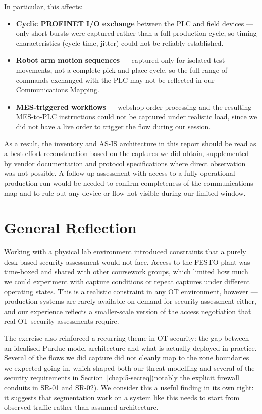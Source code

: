 \documentclass{report}
\begin{document}
In particular, this affects:
\begin{itemize}
    \item \textbf{Cyclic PROFINET I/O exchange} between the PLC and field devices — only short bursts were captured rather than a full production cycle, so timing characteristics (cycle time, jitter) could not be reliably established.
    \item \textbf{Robot arm motion sequences} — captured only for isolated test movements, not a complete pick-and-place cycle, so the full range of commands exchanged with the PLC may not be reflected in our Communications Mapping.
    \item \textbf{MES-triggered workflows} — webshop order processing and the resulting MES-to-PLC instructions could not be captured under realistic load, since we did not have a live order to trigger the flow during our session.
\end{itemize}

As a result, the inventory and AS-IS architecture in this report should be read as a best-effort reconstruction based on the captures we did obtain, supplemented by vendor documentation and protocol specifications where direct observation was not possible. A follow-up assessment with access to a fully operational production run would be needed to confirm completeness of the communications map and to rule out any device or flow not visible during our limited window.


\section{General Reflection}

Working with a physical lab environment introduced constraints that a purely desk-based security assessment would not face. Access to the FESTO plant was time-boxed and shared with other coursework groups, which limited how much we could experiment with capture conditions or repeat captures under different operating states. This is a realistic constraint in any OT environment, however — production systems are rarely available on demand for security assessment either, and our experience reflects a smaller-scale version of the access negotiation that real OT security assessments require.

The exercise also reinforced a recurring theme in OT security: the gap between an idealised Purdue-model architecture and what is actually deployed in practice. Several of the flows we did capture did not cleanly map to the zone boundaries we expected going in, which shaped both our threat modelling and several of the security requirements in Section~\ref{chap:5-secreq}(notably the explicit firewall conduits in SR-01 and SR-02). We consider this a useful finding in its own right: it suggests that segmentation work on a system like this needs to start from observed traffic rather than assumed architecture.
\end{document}
